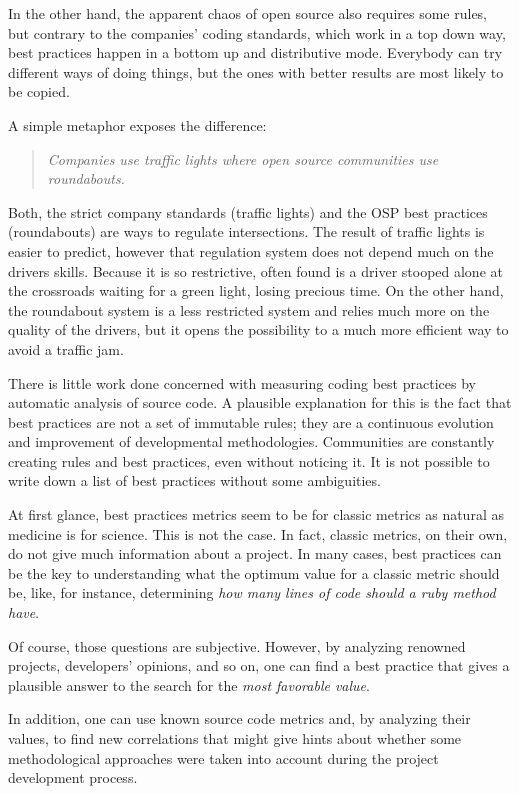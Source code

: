 In the other hand, the apparent chaos of open source also requires some rules,
but contrary to the companies' coding standards, which work in a top down way,
best practices happen in a bottom up and distributive mode.
Everybody can try different ways of doing things,
but the ones with better results are most likely to be copied.

A simple metaphor exposes the difference:
\begin{quote}\emph{
  Companies use traffic lights where open source communities use roundabouts.
}\end{quote}

Both, the strict company standards (traffic lights) and the OSP best practices (roundabouts) are ways to regulate intersections.
The result of traffic lights is  easier to predict, however that regulation  system does not depend much on the drivers skills.
Because it is so restrictive, often found is a driver stooped alone
at the crossroads waiting for a green light, losing precious time.
On the other hand, the roundabout system is a less restricted system and relies much more on the quality of the drivers,
but it opens the possibility to a much more efficient way to avoid a traffic jam.

There is little work done concerned with measuring coding best practices by automatic analysis of source code.
A plausible explanation for this is the fact that best practices are not a set of immutable rules;
they are a continuous evolution and improvement of developmental methodologies.
Communities are constantly creating rules and best practices, even without noticing it.
It is not possible to write down a list of best practices without some ambiguities.

At first glance, best practices metrics seem to be for classic metrics as natural as medicine is for science.
This is not the case.
In fact, classic metrics, on their own, do not give much information about a project.
In many cases, best practices can be the key to understanding what the optimum value for a classic metric should be,
like, for instance, determining \emph{how many lines of code should a ruby method have}.

Of course, those questions are subjective.
However, by analyzing renowned projects, developers' opinions, and so on, one can find a best practice
that gives a plausible answer to the search for the \emph{most favorable value}.

In addition, one can use known source code metrics and, by analyzing their values, 
to find new correlations that might give hints about whether some methodological approaches were 
taken into account during the project development process.

